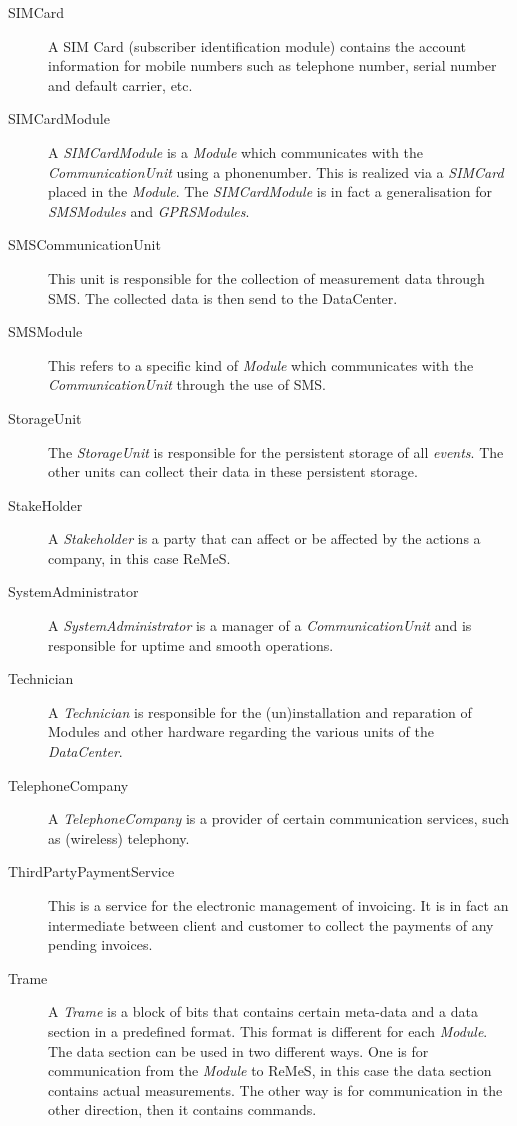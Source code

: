 \begin{description}
\item[SIMCard] A SIM Card (subscriber identification module) contains the
account information for mobile numbers such as telephone number, serial number
and default carrier, etc.

\item[SIMCardModule] A \emph{SIMCardModule} is a \emph{Module} which
communicates with the \emph{CommunicationUnit} using a phonenumber. This is
realized via a \emph{SIMCard} placed in the \emph{Module}. The
\emph{SIMCardModule} is in fact a generalisation for \emph{SMSModules} and
\emph{GPRSModules}.

\item[SMSCommunicationUnit] This unit is responsible for the collection of
measurement data through SMS. The collected data is then send to the DataCenter.

\item[SMSModule] This refers to a specific kind of \emph{Module} which
communicates with the \emph{CommunicationUnit} through the use of SMS.

\item[StorageUnit] The \emph{StorageUnit} is responsible for the persistent
storage of all \emph{events}. The other units can collect their data in these
persistent storage.

\item[StakeHolder]A \emph{Stakeholder} is a party that can affect or be
affected by the actions a company, in this case ReMeS.

\item[SystemAdministrator] A \emph{SystemAdministrator} is a manager of a
\emph{CommunicationUnit} and is responsible for uptime and smooth operations.

\item[Technician] A \emph{Technician} is responsible for the (un)installation
and reparation of Modules and other hardware regarding the various units of the
\emph{DataCenter}.

\item[TelephoneCompany] A \emph{TelephoneCompany} is a provider of certain
communication services, such as (wireless) telephony.

\item[ThirdPartyPaymentService] This is a service for the electronic management
of invoicing. It is in fact an intermediate between client and customer to
collect the payments of any pending invoices.

\item[Trame] A \emph{Trame} is a block of bits that contains certain meta-data
and a data section in a predefined format. This format is different for each
\emph{Module}. The data section can be used in two different ways. One is for
communication from the \emph{Module} to ReMeS, in this case the data section
contains actual measurements. The other way is for communication in the other
direction, then it contains commands.


\end{description}
